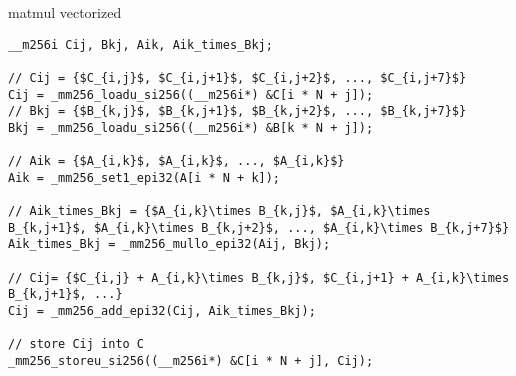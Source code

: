 \begin{frame}[fragile,label=sqVectCode]{matmul vectorized}
\begin{lstlisting}
__m256i Cij, Bkj, Aik, Aik_times_Bkj;

// Cij = {$C_{i,j}$, $C_{i,j+1}$, $C_{i,j+2}$, ..., $C_{i,j+7}$}
Cij = _mm256_loadu_si256((__m256i*) &C[i * N + j]);
// Bkj = {$B_{k,j}$, $B_{k,j+1}$, $B_{k,j+2}$, ..., $B_{k,j+7}$}
Bkj = _mm256_loadu_si256((__m256i*) &B[k * N + j]);

// Aik = {$A_{i,k}$, $A_{i,k}$, ..., $A_{i,k}$}
Aik = _mm256_set1_epi32(A[i * N + k]);

// Aik_times_Bkj = {$A_{i,k}\times B_{k,j}$, $A_{i,k}\times B_{k,j+1}$, $A_{i,k}\times B_{k,j+2}$, ..., $A_{i,k}\times B_{k,j+7}$}
Aik_times_Bkj = _mm256_mullo_epi32(Aij, Bkj);

// Cij= {$C_{i,j} + A_{i,k}\times B_{k,j}$, $C_{i,j+1} + A_{i,k}\times B_{k,j+1}$, ...}
Cij = _mm256_add_epi32(Cij, Aik_times_Bkj);

// store Cij into C
_mm256_storeu_si256((__m256i*) &C[i * N + j], Cij);
\end{lstlisting}
\end{frame}

